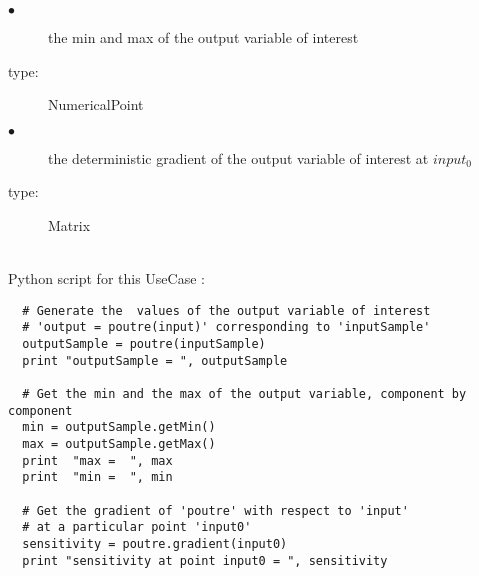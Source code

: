 {
  \begin{description}
  \item[$\bullet$] the min and max of the output variable of interest
  \item[type:] NumericalPoint
  \item[$\bullet$] the deterministic gradient of the output variable of interest at $input_0$
  \item[type:] Matrix
  \end{description}
}

\textspace\\
Python script for this UseCase :

\begin{lstlisting}
  # Generate the  values of the output variable of interest
  # 'output = poutre(input)' corresponding to 'inputSample'
  outputSample = poutre(inputSample)
  print "outputSample = ", outputSample

  # Get the min and the max of the output variable, component by component
  min = outputSample.getMin()
  max = outputSample.getMax()
  print  "max =  ", max
  print  "min =  ", min

  # Get the gradient of 'poutre' with respect to 'input'
  # at a particular point 'input0'
  sensitivity = poutre.gradient(input0)
  print "sensitivity at point input0 = ", sensitivity
\end{lstlisting}


